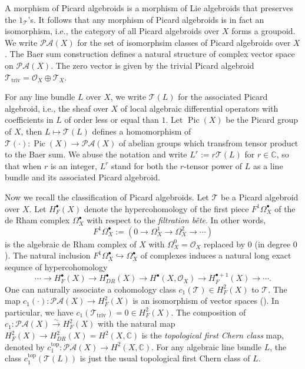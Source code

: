 \documentclass[12pt]{amsart}
\newcommand{\C}{\mathbb{C}}
\newcommand{\T}{\mathcal{T}}
\newcommand{\TT}{\mathscr{T}}
\newcommand{\pic}{\mathscr{PA}}
\newcommand{\OO}{\mathcal{O}}
\theoremstyle{definition}
\numberwithin{equation}{section}
\begin{document}
A morphism of Picard algebroids is a morphism of Lie algebroids that preserves the $1_{\TT}$'s. It follows that any morphism of Picard algebroids is in fact an isomorphism, i.e., the category of all Picard algebroids over $X$ forms a groupoid. We write $\pic(X)$ for the set of isomorphsim classes of Picard algebroids over $X$. The Baer sum construction defines  a natural structure of complex vector space on $\pic(X)$. The zero vector  is given by the trivial Picard algebroid $\TT_{\operatorname{triv}} = \OO_X \oplus \T_X$.

For any line bundle $L$ over $X$, we write $\TT(L)$ for the associated Picard algebroid, i.e., the sheaf  over $X$ of local algebraic differential operators  with coefficients in $L$ of order less or equal than $1$. Let $\operatorname{Pic}(X)$ be the Picard group of $X$, then $L \mapsto \TT(L)$ defines a homomorphism of $\TT(\cdot): \operatorname{Pic}(X) \to \pic(X)$ of abelian groups which transfrom tensor product to the Baer sum. We abuse the notation and write $L^r := r \TT(L)$ for $r \in \C$, so that when $r$ is an integer, $L^r$ stand for both the $r$-tensor power of $L$ as a line bundle and its associated Picard algebroid.

Now we recall the classification of Picard algebroids. Let $\TT$ be a Picard algebroid over $X$. Let $H^\bullet_F(X)$ denote the hypercohomology of the first piece $F^1\Omega_X^\bullet$ of the de Rham complex $\Omega_X^\bullet$ with respect to the {\it filtration bête}. In other words,
\[ F^1\Omega_X^\bullet := (0 \to \Omega_X^1 \to \Omega_X^2 \to \cdots) \]
is the algebraic de Rham complex of $X$ with $\Omega_X^0 = \OO_X$ replaced by $0$ (in degree $0$). The natural inclusion $F^1\Omega_X^\bullet \hookrightarrow \Omega_X^\bullet$ of complexes induces a natural long exact sequnce of hypercohomology
\begin{equation}\label{exsq:DR}
	\cdots \to H_F^\bullet(X) \to H^\bullet_{DR}(X) \to H^\bullet(X, \OO_X) \to H_F^{\bullet + 1}(X) \to \cdots.
\end{equation}
One can naturally associate a cohomology class $c_1(\TT) \in H^2_F(X)$ to $\TT$.  %
The map $c_1(\cdot): \pic(X) \to H^2_F(X)$ is an isomorphism of vector spaces (\cite[Lemma 2.1.6]{BB}). In particular, we have $c_1(\TT_{\operatorname{triv}}) = 0 \in H^2_F(X)$. The composition of $c_1: \pic(X) \xrightarrow{\sim} H^2_F(X)$ with the natural map $H^2_F(X) \to H^2_{DR}(X)=H^2(X,\C)$ is the {\it topological first Chern class} map, denoted by $c^{\operatorname{top}}_1 : \pic(X) \to H^2(X,\C)$. For any algebraic line bundle $L$, the class $c^{\operatorname{top}}_1(\TT(L))$ is just the usual topological first Chern class of $L$.
\end{document}
